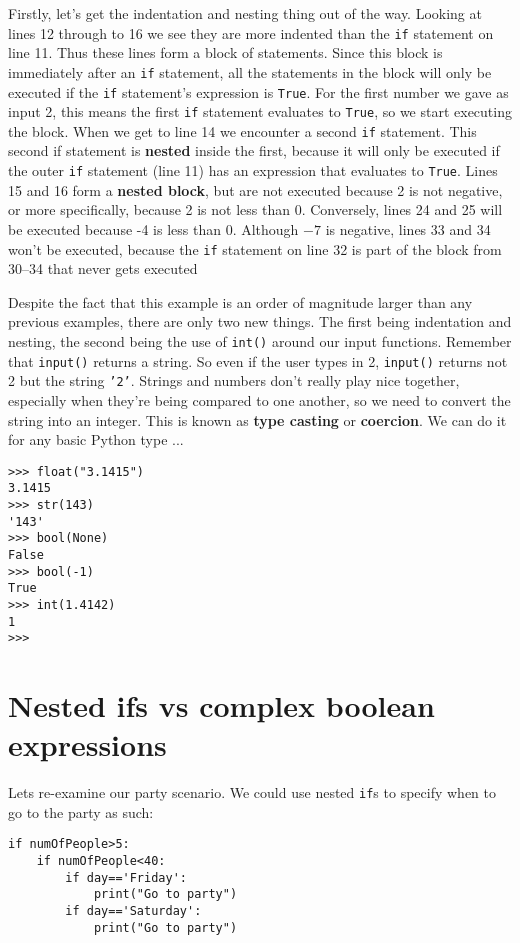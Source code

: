 Firstly, let's get the indentation and nesting thing out of the way.   Looking at lines 12 through to 16 we see they are more indented than   the \texttt{if} statement on line 11. Thus these lines form a block of   statements. Since this block is immediately after an \texttt{if} statement, all   the statements in the block will only be executed if the \texttt{if} statement's   expression is \texttt{True}. For the first number we gave as input 2, this means the first                 \texttt{if} statement evaluates to \texttt{True}, so we start executing the block. When we get to line 14 we   encounter a second \texttt{if} statement. This second if statement is   \textbf{nested} inside the first, because it will only be   executed if the outer \texttt{if} statement (line 11) has an expression that   evaluates to \texttt{True}. Lines 15 and 16 form a \textbf{nested   block}, but are not executed because 2 is not negative, or more   specifically, because 2 is not less than 0. Conversely, lines 24 and 25   will be executed because -4 is less than 0. Although $-7$ is negative, lines 33 and 34 won't be executed, because the \texttt{if} statement on line 32 is part of the block from 30--34 that never gets executed

Despite the fact that this example is an order of magnitude larger   than any previous examples, there are only two new things. The first   being indentation and nesting, the second being the use of   
\texttt{int()} around our input functions.  Remember that   \texttt{input()} returns a string. So even if the user types in 2,   \texttt{input()} returns not 2 but the string \texttt{'2'}. Strings and numbers don't   really play nice together, especially when they're being compared to   one another, so we need to convert the string into an integer. This is   known as \textbf{type casting} or \textbf{coercion}. We   can do it for any basic Python type ...
\begin{lstlisting}
>>> float("3.1415")
3.1415
>>> str(143)
'143'
>>> bool(None)
False
>>> bool(-1)
True
>>> int(1.4142)
1
>>>
\end{lstlisting}

\section{Nested ifs vs complex boolean expressions}

 Lets re-examine our party scenario. We could use nested \texttt{if}s to specify when to go to the party as such:
\begin{lstlisting}
if numOfPeople>5:
	if numOfPeople<40:
		if day=='Friday':
			print("Go to party")
		if day=='Saturday':
			print("Go to party")
\end{lstlisting}


